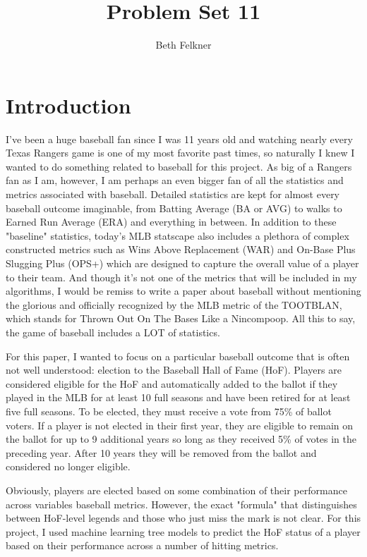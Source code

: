 \documentclass[12pt]{article}
\title{Problem Set 11}
\author{Beth Felkner}
\begin{document}
\maketitle


\section{Introduction}
\setlength{\parindent}{15pt}
I've been a huge baseball fan since I was 11 years old and watching nearly every Texas Rangers game is one of my most favorite past times, so naturally I knew I wanted to do something related to baseball for this project. As big of a Rangers fan as I am, however, I am perhaps an even bigger fan of all the statistics and metrics associated with baseball. Detailed statistics are kept for almost every baseball outcome imaginable, from Batting Average (BA or AVG) to walks to Earned Run Average (ERA) and everything in between. In addition to these "baseline" statistics, today's MLB statscape also includes a plethora of complex constructed metrics such as Wins Above Replacement (WAR) and On-Base Plus Slugging Plus (OPS+) which are designed to capture the overall value of a player to their team. And though it's not one of the metrics that will be included in my algorithms, I would be remiss to write a paper about baseball without mentioning the glorious and officially recognized by the MLB metric of the TOOTBLAN, which stands for Thrown Out On The Bases Like a Nincompoop. All this to say, the game of baseball includes a LOT of statistics.

For this paper, I wanted to focus on a particular baseball outcome that is often not well understood: election to the Baseball Hall of Fame (HoF). Players are considered eligible for the HoF and automatically added to the ballot if they played in the MLB for at least 10 full seasons and have been retired for at least five full seasons. To be elected, they must receive a vote from 75\% of ballot voters. If a player is not elected in their first year, they are eligible to remain on the ballot for up to 9 additional years so long as they received 5\% of votes in the preceding year. After 10 years they will be removed from the ballot and considered no longer eligible. 

Obviously, players are elected based on some combination of their performance across variables baseball metrics. However, the exact "formula" that distinguishes between HoF-level legends and those who just miss the mark is not clear. For this project, I used machine learning tree models to predict the HoF status of a player based on their performance across a number of hitting metrics. 
\end{document}
